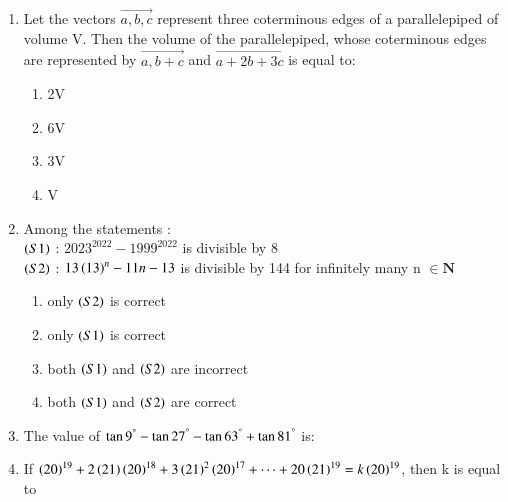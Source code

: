 \documentclass[journal]{IEEEtran}
\numberwithin{equation}{enumi}
\numberwithin{figure}{enumi}
\begin{document}
\begin{enumerate}[start=16]
    \begin{multicols}{4}
    \begin{enumerate}
        \item 580
        \item 578
        \item 576
        \item 582
    \end{enumerate} 
    \end{multicols}
    \item Let the vectors $\vec{a,b,c}$ represent three coterminous edges of a parallelepiped of volume V. Then the volume of the parallelepiped, whose coterminous edges are represented by $\vec{a,b+c}$ and $\vec{a+2b+3c}$ is equal to: \\
    \begin{multicols}{4} 
    \begin{enumerate}
        \item 2V
        \item 6V
        \item 3V
        \item V
    \end{enumerate} 
    \end{multicols}
    \item Among the statements : \\ 
    $\left(S1\right)$ : $2023^{2022}-1999^{2022}$ is divisible by $8$ \\
    $\left(S2\right)$ : $13\left(13\right)^{n}-11n-13$ is divisible by 144 for infinitely many n $\in \mathbf{N}$
    \begin{multicols}{2}
    \begin{enumerate}
        \item only $\left(S2\right)$ is correct
        \item only $\left(S1\right)$ is correct
        \item both $\left(S1\right)$ and $\left(S2\right)$ are incorrect
        \item both $\left(S1\right)$ and $\left(S2\right)$ are correct
    \end{enumerate} 
    \end{multicols}
    \item The value of $\tan{9}^{\degree}-\tan{27}^{\degree}-\tan{63}^{\degree}+\tan{81}^{\degree}$ is: \\
    \newpage
    \item If $\left(20\right)^{19}+2\left(21\right)\left(20\right)^{18}+3\left(21\right)^{2}\left(20\right)^{17}+\cdots+20\left(21\right)^{19}=k\left(20\right)^{19}$, then k is equal to \\


\end{enumerate}
\end{document}
